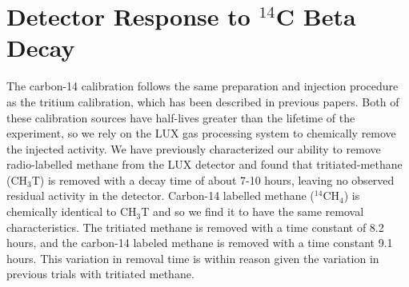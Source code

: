 \chapter{Detector Response to $^{14}$C Beta Decay}

The carbon-14 calibration follows the same preparation and injection procedure as the tritium calibration, which has been described in previous papers\cite{lux_tritium,richard,attila}. Both of these calibration sources have half-lives greater than the lifetime of the experiment, so we rely on the LUX gas processing system to chemically remove the injected activity. We have previously characterized our ability to remove radio-labelled methane from the LUX detector and found that tritiated-methane (CH$_3$T) is removed with a decay time of about 7-10 hours, leaving no observed residual activity in the detector. Carbon-14 labelled methane ($^{14}$CH$_4$) is chemically identical to CH$_3$T and so we find it to have the same removal characteristics. The tritiated methane is removed with a time constant of 8.2 hours, and the carbon-14 labeled methane is removed with a time constant 9.1 hours. This variation in removal time is within reason given the variation in previous trials with tritiated methane.
